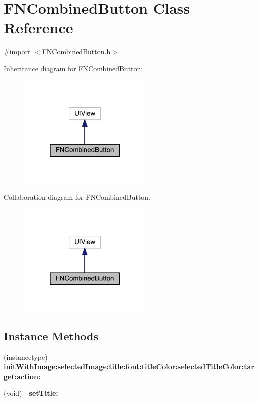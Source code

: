 \hypertarget{interface_f_n_combined_button}{}\section{F\+N\+Combined\+Button Class Reference}
\label{interface_f_n_combined_button}


{\ttfamily \#import $<$F\+N\+Combined\+Button.\+h$>$}



Inheritance diagram for F\+N\+Combined\+Button\+:\nopagebreak
\begin{figure}[H]
\begin{center}
\leavevmode
\includegraphics[width=184pt]{interface_f_n_combined_button__inherit__graph}
\end{center}
\end{figure}


Collaboration diagram for F\+N\+Combined\+Button\+:\nopagebreak
\begin{figure}[H]
\begin{center}
\leavevmode
\includegraphics[width=184pt]{interface_f_n_combined_button__coll__graph}
\end{center}
\end{figure}
\subsection*{Instance Methods}
\begin{DoxyCompactItemize}
\item 
\mbox{\label{interface_f_n_combined_button_a27727cc68630b037d0782e75a10227ef}} 
(instancetype) -\/ {\bfseries init\+With\+Image\+:selected\+Image\+:title\+:font\+:title\+Color\+:selected\+Title\+Color\+:target\+:action\+:}
\item 
\mbox{\label{interface_f_n_combined_button_a3a72e01c35724d9543975cccb0209ad3}} 
(void) -\/ {\bfseries set\+Title\+:}
\end{DoxyCompactItemize}
